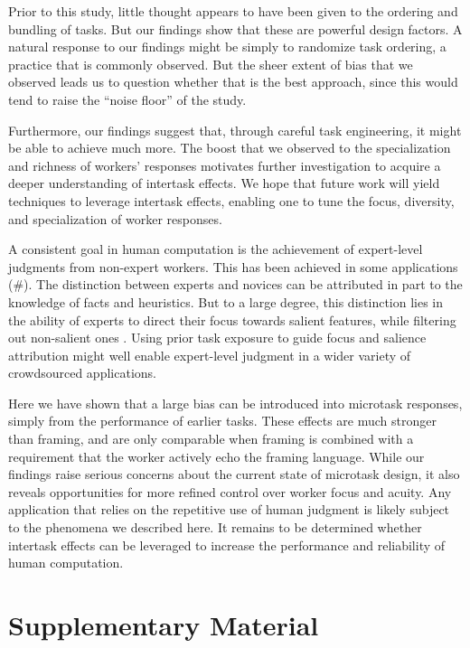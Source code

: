\documentclass[12pt]{article}
\begin{document}
Prior to this study, little thought appears to have been given to the 
ordering and bundling of tasks.  But our findings show that these are 
powerful design factors.  A natural response to our findings 
might be simply to randomize task ordering, a practice that is commonly 
observed.  But the sheer extent of bias that we observed leads us to question 
whether that is the best approach, since this would tend to raise 
the ``noise floor'' of the study.

Furthermore, our findings suggest that, through careful task engineering,
it might be able to achieve much more.  The boost that we observed to the 
specialization and richness of workers' responses motivates further 
investigation to acquire a deeper understanding of intertask effects.  
We hope that future work will yield techniques to leverage intertask effects, 
enabling one to tune the focus, diversity, and specialization of worker 
responses.

A consistent goal in human computation is the achievement of expert-level
judgments from non-expert workers.  This has been achieved in some
applications (\#). The distinction between experts and novices can be 
attributed in part to the knowledge of facts and 
heuristics. But to a large degree, this distinction lies in the ability of 
experts to direct their focus towards salient features, while filtering out 
non-salient ones \cite{kellman2009perceptual}.  Using prior task exposure to 
guide focus and salience attribution might well enable expert-level 
judgment in a wider variety of crowdsourced applications.

Here we have shown that a large bias can be introduced into microtask 
responses, simply from the performance of earlier tasks. 
These effects are much stronger than framing, and are only comparable when
framing is combined with a requirement that the worker actively echo
the framing language.  While our findings raise serious concerns about the 
current state of microtask design, it also reveals opportunities for more 
refined control over worker focus and acuity.  Any application that relies
on the repetitive use of human judgment is likely subject to the phenomena
we described here.  It remains to be determined whether intertask effects 
can be leveraged to increase the performance and reliability of human 
computation.





\section*{Supplementary Material}
\end{document}
